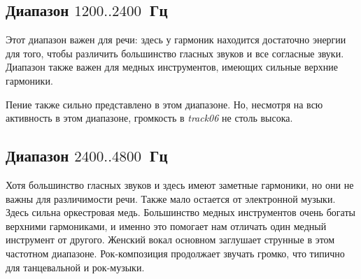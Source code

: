\documentclass{beamer}
\begin{document}
\subsection{Диапазон $1200..2400$~Гц}
\begin{frame}
Этот диапазон важен для речи: здесь у гармоник находится достаточно энергии для того, чтобы различить большинство гласных звуков и все согласные звуки. Диапазон также важен для медных инструментов, имеющих сильные верхние гармоники.

Пение также сильно представлено в этом диапазоне. Но, несмотря на всю активность в этом диапазоне, громкость в \emph{track06} не столь высока. 

\end{frame}

\subsection{Диапазон $2400..4800$~Гц}
\begin{frame}
Хотя большинство гласных звуков и здесь имеют заметные гармоники, но они не важны для различимости речи. Также мало остается от электронной музыки. Здесь сильна оркестровая медь. Большинство медных инструментов очень богаты верхними гармониками, и именно это помогает нам отличать один медный инструмент от другого. Женский вокал основном заглушает струнные в этом частотном диапазоне. Рок-композиция продолжает звучать громко, что типично для танцевальной и рок-музыки.

\end{frame}
\end{document}
